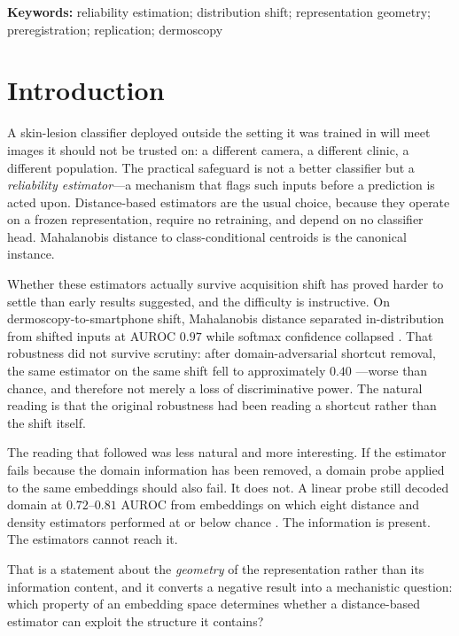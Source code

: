 \documentclass[11pt,a4paper]{article}
\begin{document}
\noindent\textbf{Keywords:} reliability estimation; distribution shift;
representation geometry; preregistration; replication; dermoscopy

\section{Introduction}

A skin-lesion classifier deployed outside the setting it was trained in will meet
images it should not be trusted on: a different camera, a different clinic, a
different population. The practical safeguard is not a better classifier but a
\emph{reliability estimator}---a mechanism that flags such inputs before a
prediction is acted upon. Distance-based estimators are the usual choice, because
they operate on a frozen representation, require no retraining, and depend on no
classifier head. Mahalanobis distance to class-conditional centroids is the
canonical instance.

Whether these estimators actually survive acquisition shift has proved harder to
settle than early results suggested, and the difficulty is instructive. On
dermoscopy-to-smartphone shift, Mahalanobis distance separated in-distribution
from shifted inputs at AUROC $0.97$ while softmax confidence collapsed
\cite{paper1}. That robustness did not survive scrutiny: after
domain-adversarial shortcut removal, the same estimator on the same shift fell to
approximately $0.40$ \cite{paper2}---worse than chance, and therefore not merely
a loss of discriminative power. The natural reading is that the original
robustness had been reading a shortcut rather than the shift itself.

The reading that followed was less natural and more interesting. If the estimator
fails because the domain information has been removed, a domain probe applied to
the same embeddings should also fail. It does not. A linear probe still decoded
domain at $0.72$--$0.81$ AUROC from embeddings on which eight distance and
density estimators performed at or below chance \cite{paper3}. The information is
present. The estimators cannot reach it.

That is a statement about the \emph{geometry} of the representation rather than
its information content, and it converts a negative result into a mechanistic
question: which property of an embedding space determines whether a
distance-based estimator can exploit the structure it contains?
\end{document}
